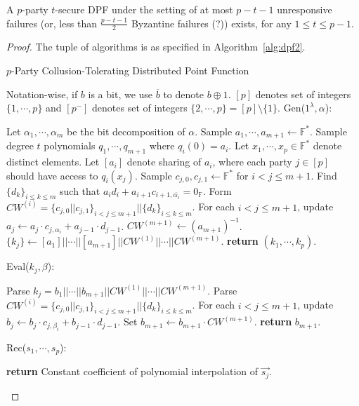 \documentclass[11pt]{article}
\newcommand{\Gen}{\textsf{Gen}}
\newcommand{\Eval}{\textsf{Eval}}
\newcommand{\Rec}{\textsf{Rec}}
\begin{document}
\begin{theorem}
  A $p$-party $t$-secure DPF under the setting of at most $p-t-1$ unresponsive failures (or, less than $\frac{p-t-1}{2}$ Byzantine failures (?)) exists, for any $1 \le t \le p-1$.
\end{theorem}
\begin{proof}
  The tuple of algorithms is as specified in Algorithm~\ref{alg:dpf2}.

  \begin{algorithm}
    \caption{$p$-Party Collusion-Tolerating Distributed Point Function}\label{alg:dpf2}
    Notation-wise, if $b$ is a bit, we use $\overline{b}$ to denote $b \oplus 1$. $[p]$ denotes set of integers $\{1, \cdots, p\}$ and $[p^-]$ denotes set of integers $\{2, \cdots, p\} = [p] \setminus \{1\}$.
    \vspace{10px}
    \newline
    \Gen($1^\lambda, \alpha$):
    \begin{algorithmic}[1]
    \State Let $\alpha_1, \cdots, \alpha_m$ be the bit decomposition of $\alpha$.
    \State Sample $a_1, \cdots, a_{m+1} \leftarrow \mathbb{F}^*$.
    \State Sample degree $t$ polynomials $q_1, \cdots, q_{m+1}$ where $q_i(0) = a_i$.
    \State Let $x_1, \cdots, x_p \in \mathbb{F}^*$ denote distinct elements.
    \State Let $[a_i]$ denote sharing of $a_i$, where each party $j \in [p]$ should have access to $q_i(x_j)$.
      \State Sample $c_{j,0}, c_{j,1} \leftarrow \mathbb{F}^*$ for $i < j \le m+1$.
      \State Find $\{d_k\}_{i \le k \le m}$ such that $a_id_i + a_{i+1}c_{i+1, \overline{\alpha_i}} = 0_\mathbb{F}$.
      \State Form $CW^{(i)} = \{c_{j,0} || c_{j,1}\}_{i < j \le m+1} || \{d_k\}_{i \le k \le m}$.
      \State For each $i < j \le m+1$, update $a_j \leftarrow a_j \cdot c_{j, \alpha_i} + a_{j-1} \cdot d_{j-1}$.
    \EndFor
    \State $CW^{(m+1)} \leftarrow (a_{m+1})^{-1}$.
    \State $\{k_j\} \leftarrow [a_1] || \cdots || [a_{m+1}] || CW^{(1)} || \cdots || CW^{(m+1)}$.
\State \textbf{return} $(k_1, \cdots, k_p)$.
    \end{algorithmic}
    
    \vspace{10px}
    \Eval($k_j, \beta$):
    \begin{algorithmic}[1]
    \State Parse $k_j = b_1||\cdots||b_{m+1}||CW^{(1)}||\cdots||CW^{(m+1)}$.
      \State Parse $CW^{(i)} = \{c_{j,0}||c_{j,1}\}_{i < j \le m+1} || \{d_k\}_{i \le k \le m}$.
      \State For each $i < j \le m+1$, update $b_j \leftarrow b_j \cdot c_{j,\beta_i} + b_{j-1} \cdot d_{j-1}$.
    \EndFor
    \State Set $b_{m+1} \leftarrow b_{m+1} \cdot CW^{(m+1)}$.
    \State \textbf{return} $b_{m+1}$.
    \end{algorithmic}
    
    \vspace{10px}
    \Rec($s_1, \cdots, s_p$):
    \begin{algorithmic}[1]
    \State \textbf{return} Constant coefficient of polynomial interpolation of $\overrightarrow{s_j}$.
    \end{algorithmic}
    \end{algorithm}
\end{proof}




\end{document}
